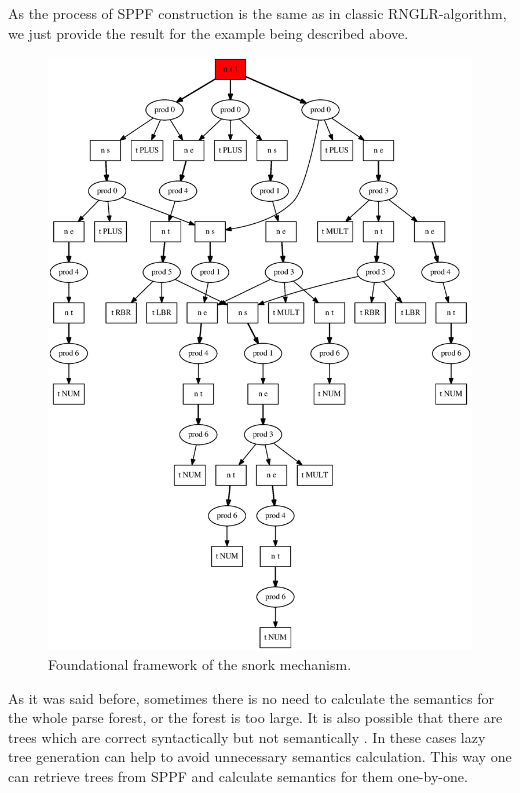 \documentclass{sigplanconf}
\begin{document}
As the process of SPPF construction is the same as in classic RNGLR-algorithm, we just provide the result for the example being described above.

\begin{figure}
    \begin{center}
        \includegraphics[scale=0.3]{Graphs/ast.eps}
    \end{center}
    \caption{Foundational framework of the snork mechanism.}
    \label{fig-ffsm}
\end{figure}

As it was said before, sometimes there is no need to calculate the semantics for the whole parse forest, or the forest is too large. It is also possible that there are trees which are correct syntactically but not semantically . In these cases lazy tree generation can help to avoid unnecessary semantics calculation. This way one can retrieve trees from SPPF and calculate semantics for them one-by-one.  
\end{document}
